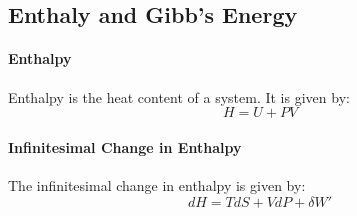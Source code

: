 \documentclass[11pt]{report}
\begin{document}
\subsection{Enthaly and Gibb's Energy}
\paragraph{Enthalpy} Enthalpy is the heat content of a system. It is given by:
\begin{equation}
    H = U + PV
\end{equation}
\paragraph{Infinitesimal Change in Enthalpy} The infinitesimal change in enthalpy is given by:
\begin{equation}
    dH = TdS + VdP + \delta W'
\end{equation}
\end{document}

